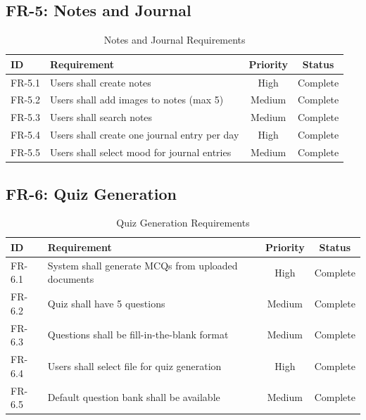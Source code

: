         \subsection{FR-5: Notes and Journal}
        \begin{table}[H]
        \centering
        \begin{tabular}{|l|p{7cm}|c|c|}
        \hline
        \textbf{ID} & \textbf{Requirement} & \textbf{Priority} & \textbf{Status} \\
        \hline
        FR-5.1 & Users shall create notes & High & Complete \\
        FR-5.2 & Users shall add images to notes (max 5) & Medium & Complete \\
        FR-5.3 & Users shall search notes & Medium & Complete \\
        FR-5.4 & Users shall create one journal entry per day & High & Complete \\
        FR-5.5 & Users shall select mood for journal entries & Medium & Complete \\
        \hline
        \end{tabular}
        \caption{Notes and Journal Requirements}
        \end{table}

        \subsection{FR-6: Quiz Generation}
        \begin{table}[H]
        \centering
        \begin{tabular}{|l|p{7cm}|c|c|}
        \hline
        \textbf{ID} & \textbf{Requirement} & \textbf{Priority} & \textbf{Status} \\
        \hline
        FR-6.1 & System shall generate MCQs from uploaded documents & High & Complete \\
        FR-6.2 & Quiz shall have 5 questions & Medium & Complete \\
        FR-6.3 & Questions shall be fill-in-the-blank format & Medium & Complete \\
        FR-6.4 & Users shall select file for quiz generation & High & Complete \\
        FR-6.5 & Default question bank shall be available & Medium & Complete \\
        \hline
        \end{tabular}
        \caption{Quiz Generation Requirements}
        \end{table}


